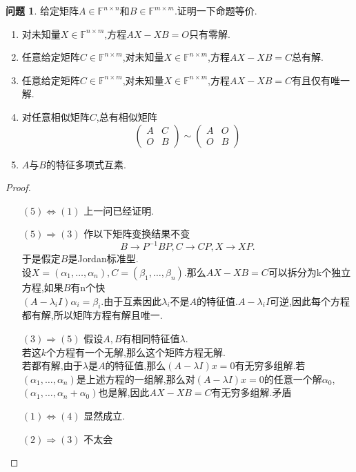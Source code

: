 \documentclass[11pt]{ctexart}
\theoremstyle{definition}
\newtheorem{qqq}{问题}[section]
\numberwithin{equation}{section}
\newcommand{\FF}{\mathbb{F}}%
\begin{document}
\begin{qqq}
    给定矩阵$A\in \FF^{n\times n}$和$B\in \FF^{m\times m}$.证明一下命题等价.
    \begin{enumerate}
        \item 对未知量$X\in \FF^{n\times m}$,方程$AX-XB=O$只有零解.
        \item 任意给定矩阵$C\in \FF^{n\times m}$,对未知量$X\in \FF^{n\times m}$,方程$AX-XB=C$总有解.
        \item 任意给定矩阵$C\in \FF^{n\times m}$,对未知量$X\in \FF^{n\times m}$,方程$AX-XB=C$有且仅有唯一解.
        \item 对任意相似矩阵$C$,总有相似矩阵\[\begin{pmatrix}A&C\\O&B\end{pmatrix}\sim\begin{pmatrix}A&O\\O&B\end{pmatrix}\]
        \item $A$与$B$的特征多项式互素.
    \end{enumerate}
\end{qqq}
\begin{proof}
    \[{}\]
    \begin{enumerate}
        \item [$(5)\Leftrightarrow(1)$]上一问已经证明.
        \item [$(5)\Rightarrow(3)$] 作以下矩阵变换结果不变\[B\rightarrow P^{-1}BP,C\rightarrow CP,X\rightarrow XP.\]于是假定$B$是Jordan标准型.\\设$X=(\alpha_1,\ldots,\alpha_n),C=(\beta_1,\ldots,\beta_n)$.那么$AX-XB=C$可以拆分为k个独立方程,如果$B$有n个快\\$(A-\lambda_i I)\alpha_i=\beta_i.$由于互素因此$\lambda_i$不是$A$的特征值.$A-\lambda_iI$可逆,因此每个方程都有解,所以矩阵方程有解且唯一.
        \item [$(3)\Rightarrow(5)$] 假设$A,B$有相同特征值$\lambda$.\\若这$k$个方程有一个无解,那么这个矩阵方程无解.\\若都有解,由于$\lambda$是$A$的特征值,那么$(A-\lambda I)x=0$有无穷多组解.若$(\alpha_1,\ldots,\alpha_n)$是上述方程的一组解,那么对$(A-\lambda I)x=0$的任意一个解$\alpha_0$,$(\alpha_1,\ldots,\alpha_n+\alpha_0)$也是解,因此$AX-XB=C$有无穷多组解.矛盾
        \item [$(1)\Leftrightarrow(4)$] 显然成立.
        \item [$(2)\Rightarrow(3)$] 不太会
    \end{enumerate}
\end{proof}
\end{document}
